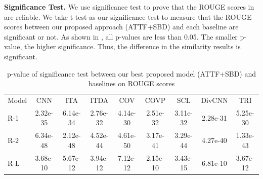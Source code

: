 \textbf{Significance Test.} We use significance test to prove that the ROUGE scores in  are reliable.
We take t-test 
\citep{loukina2014automatic}
as our significance test to
measure that the ROUGE scores between our proposed approach (ATTF+SBD) and each baseline are significant or not. 
As shown in ,
all p-values are less than 0.05. 
The smaller p-value, the higher significance.
Thus, the difference in the similarity results is significant. 

\begin{table}[th!]
	\begin{center}
		\caption{p-value of significance test between 
			our best proposed model (ATTF+SBD) and baselines on ROUGE scores}
		\begin{tabular}{lcccccccc}
			\toprule[1pt]
			Model & CNN & ITA & ITDA & COV & COVP & SCL & DivCNN & TRI \\
			\cmidrule[1pt]{1-9}
			R-1 &  2.32e-35 & 6.14e-34 & 2.76e-32 & 4.14e-30 &2.51e-32 &3.11e-32 & 2.28e-31 & 5.25e-30\\
			R-2 &  6.34e-48 & 2.12e-48& 4.52e-44 & 4.61e-50& 3.17e-41& 3.29e-44 &4.27e-40 &1.33e-43\\
			R-L & 3.68e-10 & 5.67e-12 & 3.94e-12 & 7.12e-12&2.15e-10 & 3.43e-15&6.81e-10&3.67e-12\\
			\bottomrule[1pt]
		\end{tabular}
		\label{tab:ttest}
	\end{center}
\end{table}

